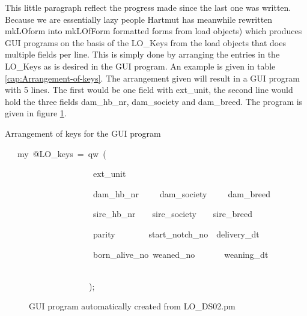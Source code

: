 This little paragraph reflect the progress made since the last one
was written. Because we are essentially lazy people Hartmut has meanwhile
rewritten mkLOform into mkLOfForm 
formatted forms from load objects) which produces GUI programs
on the basis of the LO\_Keys from the load objects that does multiple
fields per line. This is simply done by arranging the entries in the
LO\_Keys as is desired in the GUI program. An example is given in
table \ref{cap:Arrangement-of-keys}. The arrangement given will result
in a GUI program with 5 lines. The first would be one field with ext\_unit,
the second line would hold the three fields dam\_hb\_nr, dam\_society
and dam\_breed. The program is given in figure \ref{cap:GUI-program-automatically}.

%
\begin{table}[htbp]

\caption{\label{cap:Arrangement-of-keys}Arrangement of keys for the GUI program}

\begin{lyxcode}
~{\scriptsize ~~my~@LO\_keys~=~qw~(~}{\scriptsize \par}

~{\scriptsize ~~~~~~~~~~~~~~~~~~~~ext\_unit~~~~~~~~~~~~~~~~~~~~~~~}{\scriptsize \par}

~{\scriptsize ~~~~~~~~~~~~~~~~~~~~dam\_hb\_nr~~~~~dam\_society~~~~~dam\_breed}{\scriptsize \par}

~{\scriptsize ~~~~~~~~~~~~~~~~~~~~sire\_hb\_nr~~~~sire\_society~~~~sire\_breed}{\scriptsize \par}

~{\scriptsize ~~~~~~~~~~~~~~~~~~~~parity~~~~~~~~start\_notch\_no~~delivery\_dt~~~~~~~~}{\scriptsize \par}

~{\scriptsize ~~~~~~~~~~~~~~~~~~~~born\_alive\_no~weaned\_no~~~~~~~weaning\_dt~~~~~~~~~~~~~~~~~~}{\scriptsize \par}

~{\scriptsize ~~~~~~~~~~~~~~~~~~~);~}\end{lyxcode}

\end{table}


%
\begin{figure}[htbp]

\caption{\label{cap:GUI-program-automatically}GUI program automatically created
from LO\_DS02.pm}

\end{figure}



